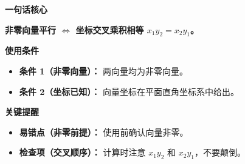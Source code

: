 \begin{summarybox}
	\textbf{\textcolor{CSummary}{一句话核心}}

	\textbf{非零向量平行 $\iff$ 坐标交叉乘积相等 $x_1y_2=x_2y_1$。}

	\medskip
	\textbf{\textcolor{CSummary}{使用条件}}
	\begin{itemize}[leftmargin=*, itemsep=0.5em, topsep=0.4em]
		\item \textbf{条件 1（非零向量）：} 两向量均为非零向量。
		\item \textbf{条件 2（坐标已知）：} 向量坐标在平面直角坐标系中给出。
	\end{itemize}

	\medskip
	\textbf{\textcolor{CSummary}{关键提醒}}
	\begin{itemize}[leftmargin=*, itemsep=0.5em, topsep=0.4em]
		\item \textbf{易错点（非零前提）：} 使用前确认向量非零。
		\item \textbf{检查项（交叉顺序）：} 计算时注意 $x_1y_2$ 和 $x_2y_1$，不要颠倒。
	\end{itemize}
\end{summarybox}
